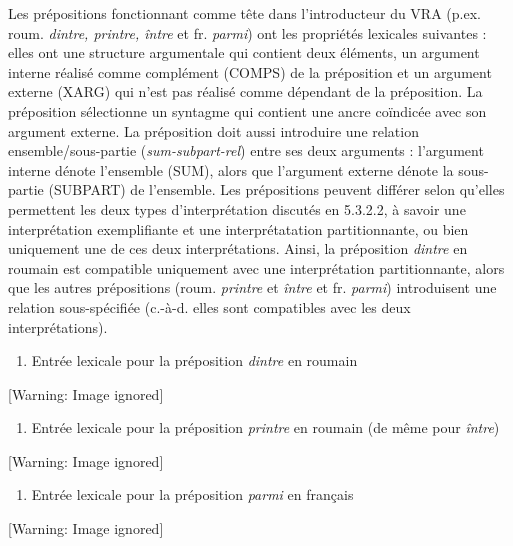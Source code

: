 Les prépositions fonctionnant comme tête dans l'introducteur du VRA (p.ex. roum. \textit{dintre, printre, între} et fr. \textit{parmi}) ont les propriétés lexicales suivantes : elles ont une structure argumentale qui contient deux éléments, un argument interne réalisé comme complément (COMPS) de la préposition et un argument externe (XARG) qui n'est pas réalisé comme dépendant de la préposition. La préposition sélectionne un syntagme qui contient une ancre coïndicée avec son argument externe. La préposition doit aussi introduire une relation ensemble/sous-partie (\textit{sum-subpart-rel}) entre ses deux arguments : l'argument interne dénote l'ensemble (SUM), alors que l'argument externe dénote la sous-partie (SUBPART) de l'ensemble. Les prépositions peuvent différer selon qu'elles permettent les deux types d'interprétation discutés en 5.3.2.2, à savoir une interprétation exemplifiante et une interprétatation partitionnante, ou bien uniquement une de ces deux interprétations. Ainsi, la préposition \textit{dintre} en roumain est compatible uniquement avec une interprétation partitionnante, alors que les autres prépositions (roum. \textit{printre} et \textit{între} et fr. \textit{parmi}) introduisent une relation sous-spécifiée (c.-à-d. elles sont compatibles avec les deux interprétations). 


\begin{enumerate}
\item Entrée lexicale pour la préposition \textit{dintre} en roumain


\end{enumerate}
  [Warning: Image ignored] %
 


\begin{enumerate}
\item Entrée lexicale pour la préposition \textit{printre} en roumain (de même pour \textit{între})  


\end{enumerate}
  [Warning: Image ignored] %
 


\begin{enumerate}
\item Entrée lexicale pour la préposition \textit{parmi} en français


\end{enumerate}
  [Warning: Image ignored] %
 

